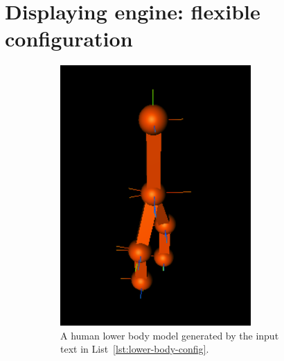 \section{Displaying engine: flexible configuration}\label{sec:flexible}
\begin{figure}[htbp]
	\centering
	\begin{subfigure}[b]{0.45\textwidth}
		\centering
		\includegraphics[width=0.8\textwidth]{
			fileForWriting/ouput-model}
		\caption[The model generated by the input text for human lower body]{A human lower body model generated by the input text in List~\ref{lst:lower-body-config}.}
		\label{fig:lower-body-model}
	\end{subfigure}
	\hfill
	\begin{subfigure}[b]{0.45\textwidth}
		\centering

\end{subfigure}
\end{figure}
